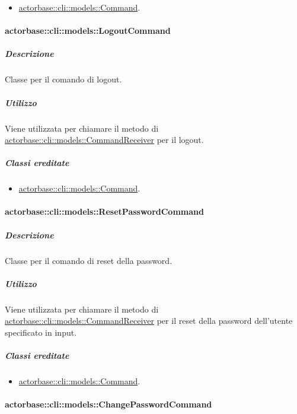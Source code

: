 \documentclass{scalatekids-article}
\begin{document}
\begin{itemize}
\item \hyperref[sec:actorbase::cli::models::Command]{actorbase::cli::models::Command}.
\end{itemize}

\paragraph{actorbase::cli::models::LogoutCommand}
\label{sec:actorbase::cli::models::LogoutCommand}

\subparagraph{Descrizione}

Classe per il comando di logout.

\subparagraph{Utilizzo}

Viene utilizzata per chiamare il metodo di
\hyperref[sec:actorbase::cli::models::CommandReceiver]{actorbase::cli::models::CommandReceiver} per il logout.

\subparagraph{Classi ereditate}

\begin{itemize}
\item \hyperref[sec:actorbase::cli::models::Command]{actorbase::cli::models::Command}.
\end{itemize}

\paragraph{actorbase::cli::models::ResetPasswordCommand}
\label{sec:actorbase::cli::models::ResetPasswordCommand}

\subparagraph{Descrizione}

Classe per il comando di reset della password.

\subparagraph{Utilizzo}

Viene utilizzata per chiamare il metodo di
\hyperref[sec:actorbase::cli::models::CommandReceiver]{actorbase::cli::models::CommandReceiver} per il reset della password
dell'utente specificato in input.

\subparagraph{Classi ereditate}

\begin{itemize}
\item \hyperref[sec:actorbase::cli::models::Command]{actorbase::cli::models::Command}.
\end{itemize}

\paragraph{actorbase::cli::models::ChangePasswordCommand}
\label{sec:actorbase::cli::models::ChangePasswordCommand}
\end{document}
